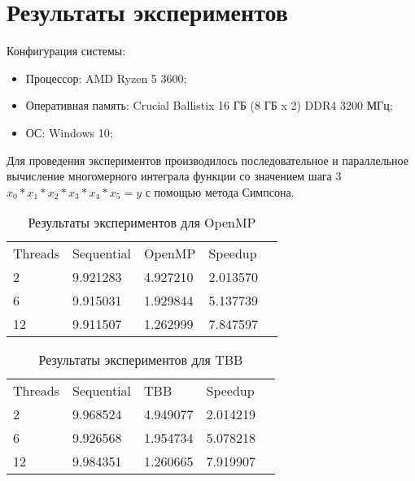 \documentclass{report}
\begin{document}
\section*{Результаты экспериментов}
Конфигурация системы:

\begin{itemize}
\item Процессор: AMD Ryzen 5 3600;
\item Оперативная память: Crucial Ballistix 16 ГБ (8 ГБ x 2) DDR4 3200 МГц;
\item ОС: Windows 10;
\end{itemize}

\par Для проведения экспериментов производилось последовательное и параллельное вычисление многомерного интеграла функции со значением шага 3 $x_0 * x_1 * x_2 * x_3 * x_4 * x_5 = y$ с помощью метода Симпсона.

\begin{table}[!h]
\caption{Результаты экспериментов для OpenMP}
\centering
\begin{tabular}{lllll}
Threads & Sequential & OpenMP & Speedup  \\
2        & 9.921283        & 4.927210    & 2.013570       \\
6        & 9.915031        & 1.929844    & 5.137739       \\
12       & 9.911507        & 1.262999    & 7.847597       
\end{tabular}
\end{table}

\begin{table}[!h]
\caption{Результаты экспериментов для TBB}
\centering
\begin{tabular}{lllll}
Threads & Sequential & TBB & Speedup  \\
2        & 9.968524        & 4.949077    & 2.014219       \\
6        & 9.926568        & 1.954734    & 5.078218       \\
12       & 9.984351        & 1.260665    & 7.919907       
\end{tabular}
\end{table}
\end{document}
